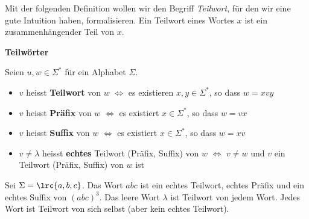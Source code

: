 Mit der folgenden Definition wollen wir den Begriff \textit{Teilwort}, für den wir eine gute Intuition haben, formalisieren. Ein Teilwort eines Wortes $x$ ist ein zusammenhängender Teil von $x$.
\begin{mydefinition}{\textbf{Teilwörter}}\label{mydefinition:Teilwort}

Seien $u,w\in\Sigma^*$ für ein Alphabet $\Sigma$.
\begin{itemize}
	\item $v$ heisst \textbf{Teilwort} von $w$ $\Leftrightarrow$ es existieren $x,y\in\Sigma^*$, so dass $w = xvy$
	\item $v$ heisst \textbf{Präfix} von $w$ $\Leftrightarrow$ es existiert $x\in\Sigma^*$, so dass $w = vx$
	\item $v$ heisst \textbf{Suffix} von $w$ $\Leftrightarrow$ es existiert $x\in\Sigma^*$, so dass $w = xv$
	\item $v\neq \lambda$ heisst \textbf{echtes} Teilwort (Präfix, Suffix) von $w$ $\Leftrightarrow$ $v\neq w$ und $v$ ein Teilwort (Präfix, Suffix) von $w$ ist
\end{itemize}
\end{mydefinition}

\begin{myexample}
Sei $\Sigma = \lrc{a,b,c}$. Das Wort $abc$ ist ein echtes Teilwort, echtes Präfix und ein echtes Suffix von $(abc)^3$. Das leere Wort $\lambda$ ist Teilwort von jedem Wort. Jedes Wort ist Teilwort von sich selbst (aber kein echtes Teilwort).
\end{myexample}

